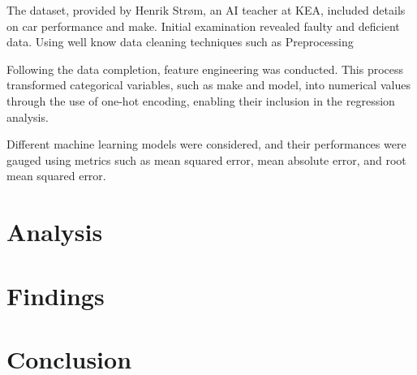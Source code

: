 \documentclass[a4paper, twocolumn]{article}
\begin{document}
The dataset, provided by Henrik Strøm, an AI teacher at KEA, included details on car performance and make. Initial examination revealed faulty and deficient data. Using well know data cleaning techniques such as Preprocessing \textcite{hellerstein2013quantitative}

Following the data completion, feature engineering was conducted. This process transformed categorical variables, such as make and model, into numerical values through the use of one-hot encoding, enabling their inclusion in the regression analysis.

Different machine learning models were considered, and their performances were gauged using metrics such as mean squared error, mean absolute error, and root mean squared error.




\section{Analysis\label{sec:Analysis}}


\section{Findings\label{sec:Findings}}


\section{Conclusion\label{sec:Conclusion}}

\end{document}
